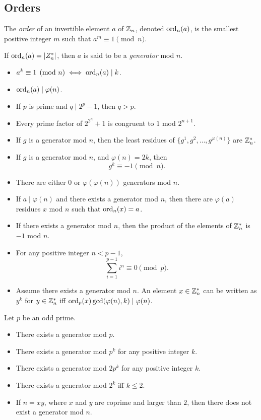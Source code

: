 \subsection{Orders}
  The \emph{order} of an invertible element $a$ of $\mathbb{Z}_n$, denoted $\mathrm{ord}_n(a)$,
  is the smallest positive integer $m$ such that $a^m\equiv 1\pmod n$.

  If $\mathrm{ord}_n(a)=|Z_n^*|$, then $a$ is said to be a \emph{generator} mod $n$.

\begin{itemize}
  \item $a^k\equiv 1\pmod n \iff \mathrm{ord}_n(a)\mid k$.
  \item $\mathrm{ord}_n(a)\mid\varphi(n)$.
  \item If $p$ is prime and $q\mid 2^p-1$, then $q>p$.
  \item Every prime factor of $2^{2^n}+1$ is congruent to $1$ mod $2^{n+1}$.
  \item If $g$ is a generator mod $n$, then the least residues of
    $\{g^1,g^2,\ldots,g^{\varphi(n)}\}$ are $\mathbb{Z}_n^*$.
  \item If $g$ is a generator mod $n$, and $\varphi(n)=2k$, then
    \[g^k\equiv -1\pmod n.\]
  \item There are either $0$ or $\varphi(\varphi(n))$ generators mod $n$.
  \item If $a\mid\varphi(n)$ and there exists a generator mod $n$, then 
    there are $\varphi(a)$ residues $x$ mod $n$ such that $\mathrm{ord}_n(x)=a$.
  \item If there exists a generator mod $n$, then the product of the elements of
    $\mathbb{Z}_n^*$ is $-1$ mod $n$.
  \item For any positive integer $n<p-1$,
    \[\sum_{i=1}^{p-1} i^n\equiv 0\pmod p.\]
  \item Assume there exists a generator mod $n$.
    An element $x\in\mathbb{Z}_n^*$ can be written as $y^k$ for $y\in\mathbb{Z}_n^*$ iff
    $\mathrm{ord}_p(x)\gcd(\varphi(n),k)\mid \varphi(n)$.
\end{itemize}
\begin{result}{\label{r:a:n:o:2}}
Let $p$ be an odd prime.
\begin{itemize}
  \item There exists a generator mod $p$.
  \item There exists a generator mod $p^k$ for any positive integer $k$.
  \item There exists a generator mod $2p^k$ for any positive integer $k$.
  \item There exists a generator mod $2^k$ iff $k\le 2$.
  \item If $n=xy$, where $x$ and $y$ are coprime and larger than $2$, then there
    does not exist a generator mod $n$.
\end{itemize}
\end{result}
